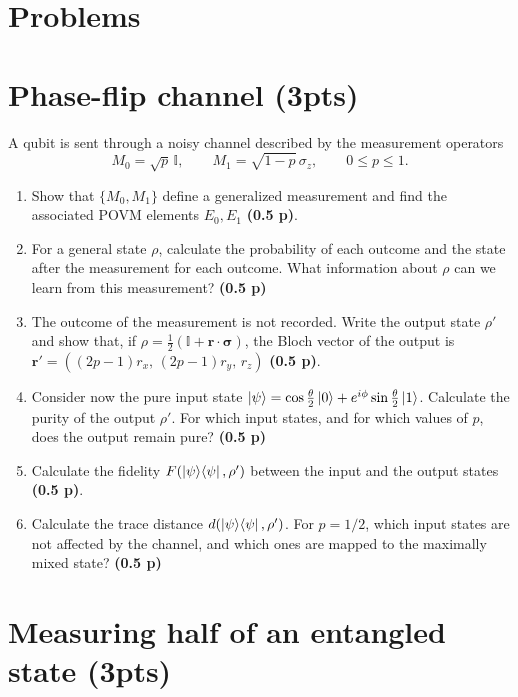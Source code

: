 \documentclass[11pt,a4paper]{article}
\newcommand{\pts}[1]{\textbf{(#1)}}
\newcommand{\id}{\mathbb{I}}
\begin{document}
\section*{Problems}

\section{Phase-flip channel (3pts)}

A qubit is sent through a noisy channel described by the measurement operators
\[
M_0=\sqrt{p}\,\id,\qquad M_1=\sqrt{1-p}\,\sigma_z,\qquad 0\le p\le1 .
\]
\begin{enumerate}
\item Show that $\{M_0,M_1\}$ define a generalized measurement and find the associated POVM
elements $E_0,E_1$ \pts{0.5 p}.
\item For a general state $\rho$, calculate the probability of each outcome and the state after
the measurement for each outcome. What information about $\rho$ can we learn from this measurement?
\pts{0.5 p}
\item The outcome of the measurement is not recorded. Write the output state $\rho'$ and show that,
if $\rho=\frac12(\id+\bm r\cdot\bm\sigma)$, the Bloch vector of the output is
$\bm r'=\left((2p-1)r_x,\,(2p-1)r_y,\,r_z\right)$ \pts{0.5 p}.
\item Consider now the pure input state $\ket\psi=\cos\frac\theta2\ket0+e^{i\phi}\sin\frac\theta2\ket1$.
Calculate the purity of the output $\rho'$. For which input states, and for which values of $p$,
does the output remain pure? \pts{0.5 p}
\item Calculate the fidelity $F(\ket\psi\!\bra\psi,\rho')$ between the input and the output states \pts{0.5 p}.
\item Calculate the trace distance $d(\ket\psi\!\bra\psi,\rho')$. For $p=1/2$, which input states
are not affected by the channel, and which ones are mapped to the maximally mixed state? \pts{0.5 p}
\end{enumerate}

\section{Measuring half of an entangled state (3pts)}
\end{document}

